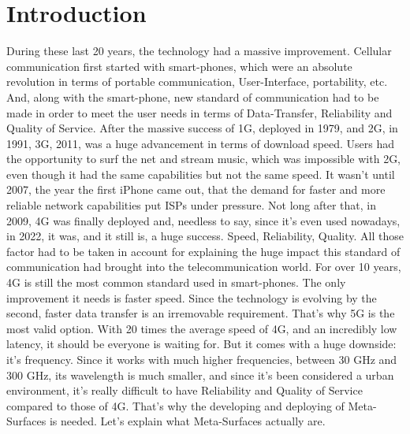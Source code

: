 \chapter{Introduction}
\label{sec:Introduction}
During these last 20 years, the technology had a massive improvement. Cellular communication first started with smart-phones, which were an absolute revolution in terms of portable communication, User-Interface, portability, etc. And, along with the smart-phone, new standard of communication had to be made in order to meet the user needs in terms of Data-Transfer, Reliability and Quality of Service. After the massive success of 1G, deployed in 1979, and 2G, in 1991, 3G, 2011, was a huge advancement in terms of download speed. Users had the opportunity to surf the net and stream music, which was impossible with 2G, even though it had the same capabilities but not the same speed. It wasn't until 2007, the year the first iPhone came out, that the demand for faster and more reliable network capabilities put ISPs under pressure. Not long after that, in 2009, 4G was finally deployed and, needless to say, since it's even used nowadays, in 2022, it was, and it still is, a huge success. Speed, Reliability, Quality. All those factor had to be taken in account for explaining the huge impact this standard of communication had brought into the telecommunication world. For over 10 years, 4G is still the most common standard used in smart-phones. The only improvement it needs is faster speed. Since the technology is evolving by the second, faster data transfer is an irremovable requirement. That's why 5G is the most valid option. With 20 times the average speed of 4G, and an incredibly low latency, it should be everyone is waiting for. But it comes with a huge downside: it's frequency. Since it works with much higher frequencies, between 30 GHz and 300 GHz, its wavelength is much smaller, and since it's been considered a urban environment, it's really difficult to have Reliability and Quality of Service compared to those of 4G. That's why the developing and deploying of Meta-Surfaces is needed. Let's explain what Meta-Surfaces actually are.
